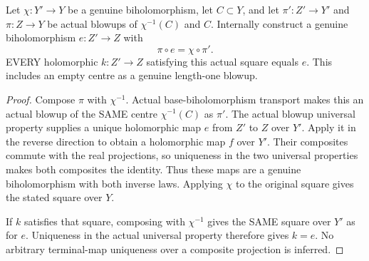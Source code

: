 \begin{theorem}
\label{hir:sharp-actual-stage-matched-blowup-unique-lift}
\leanok
Let $\chi:Y'\to Y$ be a genuine biholomorphism, let $C\subset Y$,
and let $\pi':Z'\to Y'$ and $\pi:Z\to Y$ be actual blowups of
$\chi^{-1}(C)$ and $C$. Internally construct a genuine biholomorphism
$e:Z'\to Z$ with
\[
                  \pi\circ e=\chi\circ\pi'.
\]
EVERY holomorphic $k:Z'\to Z$ satisfying this actual square equals $e$.
This includes an empty centre as a genuine length-one blowup.
\end{theorem}
\begin{proof}
Compose $\pi$ with $\chi^{-1}$. Actual base-biholomorphism transport
makes this an actual blowup of the SAME centre $\chi^{-1}(C)$ as
$\pi'$. The actual blowup universal property supplies a unique
holomorphic map $e$ from $Z'$ to $Z$ over $Y'$. Apply it in the reverse
direction to obtain a holomorphic map $f$ over $Y'$. Their composites
commute with the real projections, so uniqueness in the two universal
properties makes both composites the identity. Thus these maps are a
genuine biholomorphism with both inverse laws. Applying $\chi$ to the
original square gives the stated square over $Y$.

If $k$ satisfies that square, composing with $\chi^{-1}$ gives the SAME
square over $Y'$ as for $e$. Uniqueness in the actual universal property
therefore gives $k=e$. No arbitrary terminal-map uniqueness over a
composite projection is inferred.
\end{proof}

